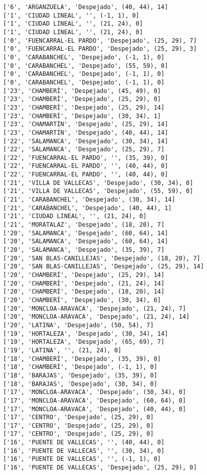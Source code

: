\documentclass[11pt]{article}
\begin{document}
\begin{Verbatim}[commandchars=\\\{\}]
['6', 'ARGANZUELA', 'Despejado', (40, 44), 14]
['1', 'CIUDAD LINEAL', '', (-1, 1), 0]
['1', 'CIUDAD LINEAL', '', (21, 24), 0]
['1', 'CIUDAD LINEAL', '', (21, 24), 0]
['0', 'FUENCARRAL-EL PARDO', 'Despejado', (25, 29), 7]
['0', 'FUENCARRAL-EL PARDO', 'Despejado', (25, 29), 3]
['0', 'CARABANCHEL', 'Despejado', (-1, 1), 0]
['0', 'CARABANCHEL', 'Despejado', (55, 59), 0]
['0', 'CARABANCHEL', 'Despejado', (-1, 1), 0]
['0', 'CARABANCHEL', 'Despejado', (-1, 1), 0]
['23', 'CHAMBERÍ', 'Despejado', (45, 49), 0]
['23', 'CHAMBERÍ', 'Despejado', (25, 29), 0]
['23', 'CHAMBERÍ', 'Despejado', (25, 29), 14]
['23', 'CHAMBERÍ', 'Despejado', (30, 34), 1]
['23', 'CHAMARTÍN', 'Despejado', (25, 29), 14]
['23', 'CHAMARTÍN', 'Despejado', (40, 44), 14]
['22', 'SALAMANCA', 'Despejado', (30, 34), 14]
['22', 'SALAMANCA', 'Despejado', (25, 29), 7]
['22', 'FUENCARRAL-EL PARDO', '', (35, 39), 0]
['22', 'FUENCARRAL-EL PARDO', '', (40, 44), 0]
['22', 'FUENCARRAL-EL PARDO', '', (40, 44), 0]
['21', 'VILLA DE VALLECAS', 'Despejado', (30, 34), 0]
['21', 'VILLA DE VALLECAS', 'Despejado', (55, 59), 0]
['21', 'CARABANCHEL', 'Despejado', (30, 34), 14]
['21', 'CARABANCHEL', 'Despejado', (40, 44), 1]
['21', 'CIUDAD LINEAL', '', (21, 24), 0]
['21', 'MORATALAZ', 'Despejado', (18, 20), 7]
['20', 'SALAMANCA', 'Despejado', (60, 64), 14]
['20', 'SALAMANCA', 'Despejado', (60, 64), 14]
['20', 'SALAMANCA', 'Despejado', (35, 39), 7]
['20', 'SAN BLAS-CANILLEJAS', 'Despejado', (18, 20), 7]
['20', 'SAN BLAS-CANILLEJAS', 'Despejado', (25, 29), 14]
['20', 'CHAMBERÍ', 'Despejado', (25, 29), 14]
['20', 'CHAMBERÍ', 'Despejado', (21, 24), 14]
['20', 'CHAMBERÍ', 'Despejado', (18, 20), 14]
['20', 'CHAMBERÍ', 'Despejado', (30, 34), 6]
['20', 'MONCLOA-ARAVACA', 'Despejado', (21, 24), 7]
['20', 'MONCLOA-ARAVACA', 'Despejado', (21, 24), 14]
['20', 'LATINA', 'Despejado', (50, 54), 7]
['19', 'HORTALEZA', 'Despejado', (30, 34), 14]
['19', 'HORTALEZA', 'Despejado', (65, 69), 7]
['19', 'LATINA', '', (21, 24), 0]
['18', 'CHAMBERÍ', 'Despejado', (35, 39), 0]
['18', 'CHAMBERÍ', 'Despejado', (-1, 1), 0]
['18', 'BARAJAS', 'Despejado', (35, 39), 0]
['18', 'BARAJAS', 'Despejado', (30, 34), 0]
['17', 'MONCLOA-ARAVACA', 'Despejado', (30, 34), 0]
['17', 'MONCLOA-ARAVACA', 'Despejado', (60, 64), 0]
['17', 'MONCLOA-ARAVACA', 'Despejado', (40, 44), 0]
['17', 'CENTRO', 'Despejado', (25, 29), 0]
['17', 'CENTRO', 'Despejado', (25, 29), 0]
['17', 'CENTRO', 'Despejado', (25, 29), 0]
['16', 'PUENTE DE VALLECAS', '', (40, 44), 0]
['16', 'PUENTE DE VALLECAS', '', (30, 34), 0]
['16', 'PUENTE DE VALLECAS', '', (-1, 1), 0]
['16', 'PUENTE DE VALLECAS', 'Despejado', (25, 29), 0]

\end{Verbatim}
\end{document}

